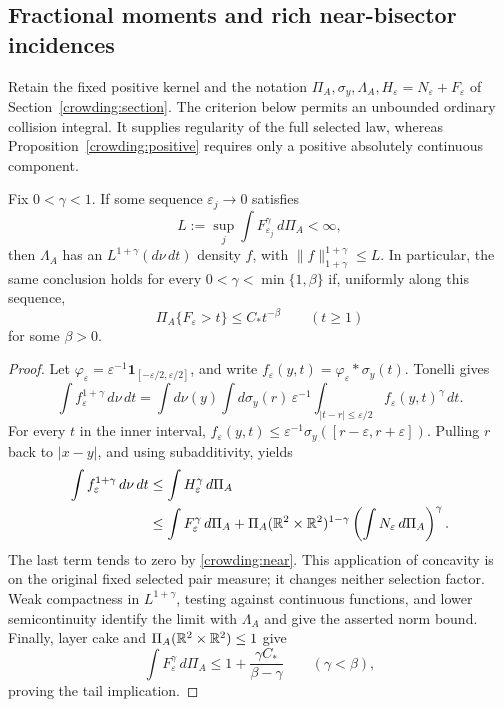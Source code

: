 \subsection{Fractional moments and rich near-bisector incidences}
\label{crowding:fractional-section}

Retain the fixed positive kernel and the notation
\(\Pi_A,\sigma_y,\Lambda_A,H_\varepsilon=N_\varepsilon+F_\varepsilon\)
of Section~\ref{crowding:section}. The criterion below permits an
unbounded ordinary collision integral. It supplies regularity of the
full selected law, whereas Proposition~\ref{crowding:positive} requires
only a positive absolutely continuous component.

\begin{proposition}\label{crowding:fractional}
Fix \(0<\gamma<1\). If some sequence \(\varepsilon_j\to0\) satisfies
\[
 L:=\sup_j\int F_{\varepsilon_j}^{\gamma}\,d\Pi_A<\infty,
\]
then \(\Lambda_A\) has an \(L^{1+\gamma}(d\nu\,dt)\) density \(f\),
with \(\|f\|_{1+\gamma}^{1+\gamma}\le L\).
In particular, the same conclusion holds for every
\(0<\gamma<\min\{1,\beta\}\) if, uniformly along this sequence,
\begin{equation}\label{crowding:fartail}
 \Pi_A\{F_\varepsilon>t\}\le C_*t^{-\beta}
 \qquad(t\ge1)
\end{equation}
for some \(\beta>0\).
\end{proposition}

\begin{proof}
Let \(\varphi_\varepsilon=\varepsilon^{-1}
\mathbf1_{[-\varepsilon/2,\varepsilon/2]}\), and write
\(f_\varepsilon(y,t)=\varphi_\varepsilon*\sigma_y(t)\).
Tonelli gives
\[
 \int f_\varepsilon^{1+\gamma}\,d\nu\,dt
 =\int d\nu(y)\int d\sigma_y(r)\,
  \varepsilon^{-1}\int_{|t-r|\le\varepsilon/2}
                    f_\varepsilon(y,t)^\gamma\,dt.
\]
For every \(t\) in the inner interval,
\(f_\varepsilon(y,t)\le
\varepsilon^{-1}\sigma_y([r-\varepsilon,r+\varepsilon])\).
Pulling \(r\) back to \(|x-y|\), and using subadditivity, yields
\begin{align}
 \int f_\varepsilon^{1+\gamma}\,d\nu\,dt
 &\le\int H_\varepsilon^\gamma\,d\Pi_A\notag\\
 &\le\int F_\varepsilon^\gamma\,d\Pi_A
   +\Pi_A(\mathbb R^2\times\mathbb R^2)^{1-\gamma}
       \left(\int N_\varepsilon\,d\Pi_A\right)^\gamma.
 \label{crowding:fractionalnear}
\end{align}
The last term tends to zero by \eqref{crowding:near}. This application
of concavity is on the original fixed selected pair measure; it changes
neither selection factor. Weak compactness in \(L^{1+\gamma}\),
testing against continuous functions, and lower semicontinuity identify
the limit with \(\Lambda_A\) and give the asserted norm bound.
Finally, layer cake and \(\Pi_A(\mathbb R^2\times\mathbb R^2)\le1\) give
\[
 \int F_\varepsilon^\gamma\,d\Pi_A
 \le1+\frac{\gamma C_*}{\beta-\gamma}
 \qquad(\gamma<\beta),
\]
proving the tail implication.
\end{proof}

